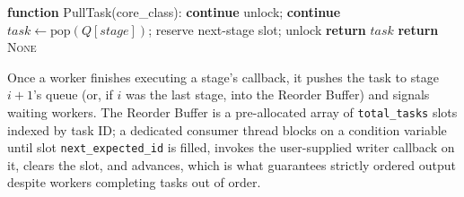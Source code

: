 \documentclass[conference]{IEEEtran}
\begin{document}
\begin{algorithm}[htbp]
\caption{Per-worker task pull (non-blocking, priority-ordered)}
\label{alg:pull}
\begin{algorithmic}
\STATE \textbf{function} PullTask(core\_class):
        \STATE \textbf{continue}
    \ENDIF
        \STATE unlock; \textbf{continue}
    \ENDIF
    \STATE $task \gets \text{pop}(Q[stage])$; reserve next-stage slot; unlock
    \STATE \textbf{return} $task$
\ENDFOR
\STATE \textbf{return} \textsc{None} 
\end{algorithmic}
\end{algorithm}

Once a worker finishes executing a stage's callback, it pushes the task to stage $i{+}1$'s queue (or, if $i$ was the last stage, into the Reorder Buffer) and signals waiting workers. The Reorder Buffer is a pre-allocated array of \texttt{total\_tasks} slots indexed by task ID; a dedicated consumer thread blocks on a condition variable until slot \texttt{next\_expected\_id} is filled, invokes the user-supplied writer callback on it, clears the slot, and advances, which is what guarantees strictly ordered output despite workers completing tasks out of order.
\end{document}
